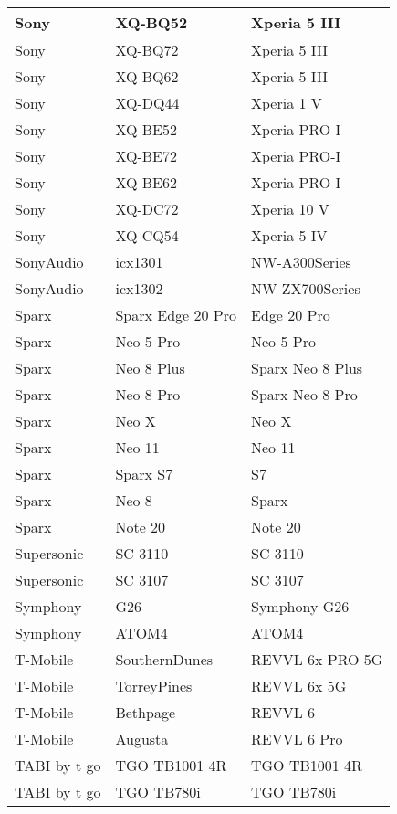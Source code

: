 \begin{tabularx}{\linewidth}{|l|X|X|}
        Sony & XQ-BQ52 & Xperia 5 III \\ \hline
        Sony & XQ-BQ72 & Xperia 5 III \\ \hline
        Sony & XQ-BQ62 & Xperia 5 III \\ \hline
        Sony & XQ-DQ44 & Xperia 1 V \\ \hline
        Sony & XQ-BE52 & Xperia PRO-I \\ \hline
        Sony & XQ-BE72 & Xperia PRO-I \\ \hline
        Sony & XQ-BE62 & Xperia PRO-I \\ \hline
        Sony & XQ-DC72 & Xperia 10 V \\ \hline
        Sony & XQ-CQ54 & Xperia 5 IV \\ \hline
        SonyAudio & icx1301 & NW-A300Series \\ \hline
        SonyAudio & icx1302 & NW-ZX700Series \\ \hline
        Sparx & Sparx Edge 20 Pro & Edge 20 Pro \\ \hline
        Sparx & Neo 5 Pro & Neo 5 Pro \\ \hline
        Sparx & Neo 8 Plus & Sparx Neo 8 Plus \\ \hline
        Sparx & Neo 8 Pro & Sparx Neo 8 Pro \\ \hline
        Sparx & Neo X & Neo X \\ \hline
        Sparx & Neo 11 & Neo 11 \\ \hline
        Sparx & Sparx S7 & S7 \\ \hline
        Sparx & Neo 8 & Sparx \\ \hline
        Sparx & Note 20 & Note 20 \\ \hline
        Supersonic & SC 3110 & SC 3110 \\ \hline
        Supersonic & SC 3107 & SC 3107 \\ \hline
        Symphony & G26 & Symphony G26 \\ \hline
        Symphony & ATOM4 & ATOM4 \\ \hline
        T-Mobile & SouthernDunes & REVVL 6x PRO 5G \\ \hline
        T-Mobile & TorreyPines & REVVL 6x 5G \\ \hline
        T-Mobile & Bethpage & REVVL 6 \\ \hline
        T-Mobile & Augusta & REVVL 6 Pro \\ \hline
        TABI by t go & TGO TB1001 4R & TGO TB1001 4R \\ \hline
        TABI by t go & TGO TB780i & TGO TB780i \\ \hline

\end{tabularx}
